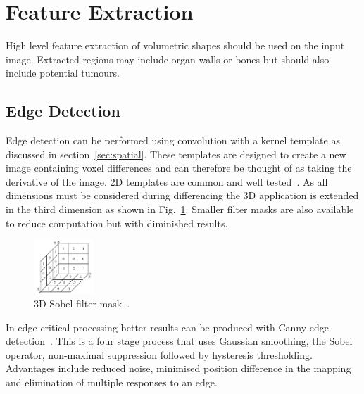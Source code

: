 \documentclass[journal]{IEEEtran}
\begin{document}
\section{Feature Extraction}
\label{sec:extraction}

High level feature extraction of volumetric shapes should be used on the input image.
Extracted regions may include organ walls or bones but should also include potential tumours.


\subsection{Edge Detection}
\label{sec:edge}
Edge detection can be performed using convolution with a kernel template as discussed in section~\ref{sec:spatial}. 
These templates are designed to create a new image containing voxel differences and can therefore be thought of as taking the derivative of the image.
2D templates are common and well tested~\cite{nixon02feature}.
As all dimensions must be considered during differencing the 3D application is extended in the third dimension as shown in Fig.~\ref{fig:sobel}.
Smaller filter masks are also available to reduce computation but with diminished results.

\begin{figure}[!htb]
   \centering
   \includegraphics[width = 0.2\textwidth]{Figures/Sobel.pdf}
   \caption{3D Sobel filter mask~\cite{lohmann1998volumetric}.}
   \label{fig:sobel}
\end{figure}

In edge critical processing better results can be produced with Canny edge detection~\cite{canny86edge}. 
This is a four stage process that uses Gaussian smoothing, the Sobel operator, non-maximal suppression followed by hysteresis thresholding.
Advantages include reduced noise, minimised position difference in the mapping and elimination of multiple responses to an edge.
\end{document}

